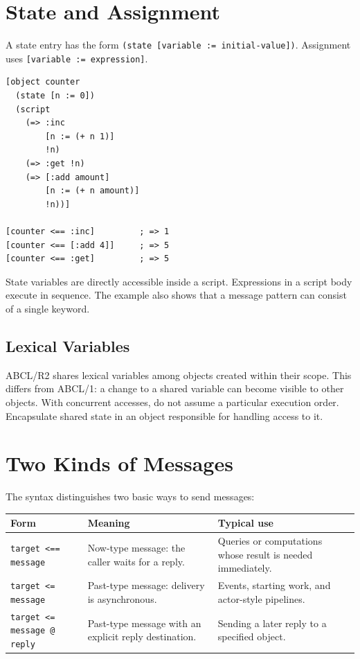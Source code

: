 \documentclass[11pt,a4paper]{article}
\newcommand{\code}[1]{\texttt{#1}}
\begin{document}


\section{State and Assignment}
\label{sec:state}

A state entry has the form \code{(state [variable := initial-value])}.
Assignment uses \code{[variable := expression]}.

\begin{lstlisting}
[object counter
  (state [n := 0])
  (script
    (=> :inc
        [n := (+ n 1)]
        !n)
    (=> :get !n)
    (=> [:add amount]
        [n := (+ n amount)]
        !n))]

[counter <== :inc]         ; => 1
[counter <== [:add 4]]     ; => 5
[counter <== :get]         ; => 5
\end{lstlisting}

State variables are directly accessible inside a script.
Expressions in a script body execute in sequence.
The example also shows that a message pattern can consist of a single keyword.

\subsection{Lexical Variables}

ABCL/R2 shares lexical variables among objects created within their scope.
This differs from ABCL/1: a change to a shared variable can become visible
to other objects. With concurrent accesses, do not assume a particular
execution order. Encapsulate shared state in an object responsible for
handling access to it.

\section{Two Kinds of Messages}
\label{sec:messages}

The syntax distinguishes two basic ways to send messages:

\begin{longtable}{L{0.28\textwidth}L{0.29\textwidth}L{0.33\textwidth}}
\textbf{Form} & \textbf{Meaning} & \textbf{Typical use}\\\hline
\code{target <== message} & Now-type message: the caller waits for a reply. &
Queries or computations whose result is needed immediately.\\
\code{target <= message} & Past-type message: delivery is asynchronous. &
Events, starting work, and actor-style pipelines.\\
\code{target <= message @ reply} & Past-type message with an explicit
reply destination. & Sending a later reply to a specified object.\\
\end{longtable}
\end{document}
